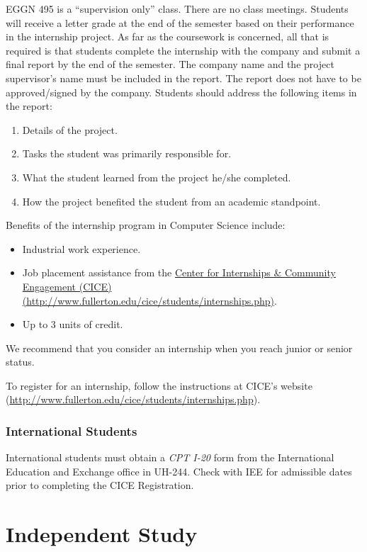 \documentclass{book}
\begin{document}
EGGN 495 is a ``supervision only'' class. There are no class meetings. Students will receive a letter grade at the end of the semester based on their performance in the internship project. As far as the coursework is concerned, all that is required is that students complete the internship with the company and submit a final report by the end of the semester. The company name and the project supervisor's name must be included in the report. The report does not have to be approved/signed by the company. Students should address the following items in the report:
\begin{enumerate}
\item Details of the project.
\item Tasks the student was primarily responsible for.
\item What the student learned from the project he/she completed.
\item How the project benefited the student from an academic standpoint.
\end{enumerate}

Benefits of the internship program in Computer Science include:
\begin{itemize}
\item Industrial work experience.
\item Job placement assistance from the \href{http://www.fullerton.edu/cice/students/internships.php}{Center for Internships \& Community Engagement (CICE) (\url{http://www.fullerton.edu/cice/students/internships.php})}.
\item Up to 3 units of credit.
\end{itemize}

We recommend that you consider an internship when you reach junior or senior status.

To register for an internship, follow the instructions at CICE's website (\url{http://www.fullerton.edu/cice/students/internships.php}).

\subsubsection{International Students}

International students must obtain a \emph{CPT I-20} form from the International Education and Exchange office in UH-244. Check with IEE for admissible dates prior to completing the CICE Registration.

\section{Independent Study}
\end{document}
